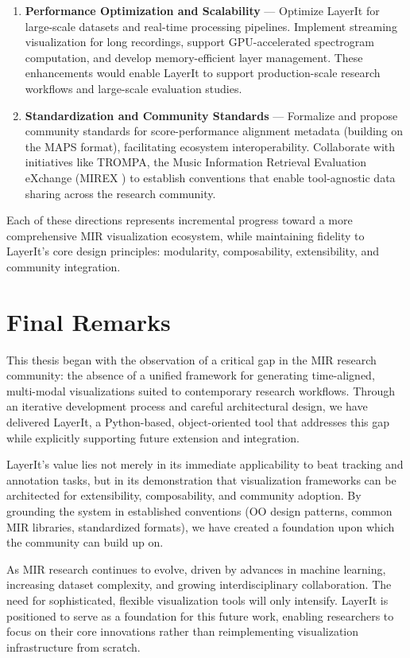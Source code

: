 \begin{enumerate}
\item \textbf{Performance Optimization and Scalability} — Optimize LayerIt for large-scale datasets and real-time processing pipelines. Implement streaming visualization for long recordings, support GPU-accelerated spectrogram computation, and develop memory-efficient layer management. These enhancements would enable LayerIt to support production-scale research workflows and large-scale evaluation studies.

\item \textbf{Standardization and Community Standards} — Formalize and propose community standards for score-performance alignment metadata (building on the MAPS format), facilitating ecosystem interoperability. Collaborate with initiatives like TROMPA, the Music Information Retrieval Evaluation eXchange (MIREX )  to establish conventions that enable tool-agnostic data sharing across the research community.

\end{enumerate}

Each of these directions represents incremental progress toward a more comprehensive MIR visualization ecosystem, while maintaining fidelity to LayerIt's core design principles: modularity, composability, extensibility, and community integration.

\section{Final Remarks}
This thesis began with the observation of a critical gap in the MIR research community: the absence of a unified framework for generating time-aligned, multi-modal visualizations suited to contemporary research workflows. Through an iterative development process and careful architectural design, we have delivered LayerIt, a Python-based, object-oriented tool that addresses this gap while explicitly supporting future extension and integration.

LayerIt's value lies not merely in its immediate applicability to beat tracking and annotation tasks, but in its demonstration that visualization frameworks can be architected for extensibility, composability, and community adoption. By grounding the system in established conventions (OO design patterns, common MIR libraries, standardized formats), we have created a foundation upon which the community can build up on.

As MIR research continues to evolve, driven by advances in machine learning, increasing dataset complexity, and growing interdisciplinary collaboration. The need for sophisticated, flexible visualization tools will only intensify. LayerIt is positioned to serve as a foundation for this future work, enabling researchers to focus on their core innovations rather than reimplementing visualization infrastructure from scratch.
\vspace*{12mm}
